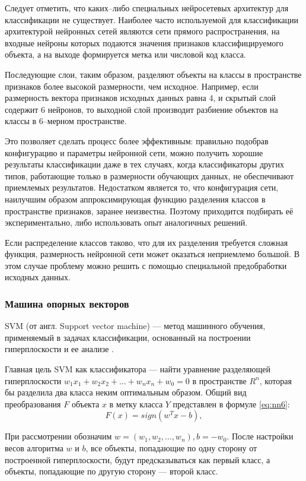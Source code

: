 Следует отметить, что каких--либо специальных нейросетевых архитектур для классификации не существует. Наиболее часто используемой для классификации архитектурой нейронных сетей являются сети прямого распространения, на входные нейроны которых подаются значения признаков классифицируемого объекта, а на выходе формируется метка или числовой код класса.

Последующие слои, таким образом, разделяют объекты на классы в пространстве признаков более высокой размерности, чем исходное. Например, если размерность вектора признаков исходных данных равна 4, и скрытый слой содержит 6 нейронов, то выходной слой производит разбиение объектов на классы в 6--мерном пространстве.

Это позволяет сделать процесс более эффективным: правильно подобрав конфигурацию и параметры нейронной сети, можно получить хорошие результаты классификации даже в тех случаях, когда классификаторы других типов, работающие только в размерности обучающих данных, не обеспечивают приемлемых результатов. Недостатком является то, что конфигурация сети, наилучшим образом аппроксимирующая функцию разделения классов в пространстве признаков, заранее неизвестна. Поэтому приходится подбирать её экспериментально, либо использовать опыт аналогичных решений.

Если распределение классов таково, что для их разделения требуется сложная функция, размерность нейронной сети может оказаться неприемлемо большой. В этом случае проблему можно решить с помощью специальной предобработки исходных данных.

\subsubsection{Машина опорных векторов}

SVM (от англ. Support vector machine) --- метод машинного обучения, применяемый в задачах классификации, основанный на построении гиперплоскости и ее анализе \cite{svm}.

Главная цель SVM как классификатора --- найти уравнение разделяющей гиперплоскости $w_1x_1+w_2x_2+…+w_nx_n+w_0=0$ в пространстве $R^n$, которая бы разделила два класса неким оптимальным образом. Общий вид преобразования $F$ объекта $x$ в метку класса $Y$ представлен в формуле \ref{eq:nn6}: 
\begin{equation}
	\label{eq:nn6}
	F(x) = sign(w^Tx-b),
\end{equation}

При рассмотрении обозначим $w = (w_1, w_2, …, w_n), b=-w_0$. После настройки весов алгоритма $w$ и $b$, все объекты, попадающие по одну сторону от построенной гиперплоскости, будут предсказываться как первый класс, а объекты, попадающие по другую сторону --- второй класс.


